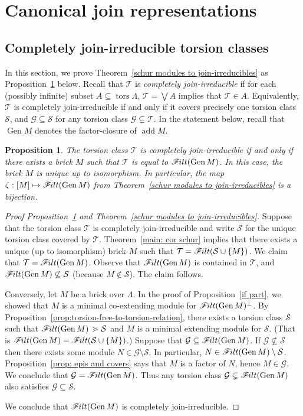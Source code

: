 \documentclass[10pt]{amsart}
\providecommand{\1}{}
\DeclareMathOperator{\tors}{tors}
\DeclareMathOperator{\add}{add}
\newcommand{\calG}{\mathcal{G}}
\newcommand{\calS}{\mathcal{S}}
\newcommand{\calT}{\mathcal{T}}
\newcommand{\filt}{\mathscr{F}\Mk ilt}
\newcommand{\covers}{{\,\,\,\cdot\!\!\!\! >\,\,}}
\renewcommand{\Join}{\bigvee}
\newcommand{\Gen}{\operatorname{Gen}}
\renewcommand{\1}{\hat{1}}
\newcommand{\0}{\hat{0}}
\newcommand{\newword}[1]{\emph{#1}}
\newcommand*{\Mk}{\mkern -2mu}
\newtheorem{proposition}[theorem]{Proposition}
\theoremstyle{definition}
\begin{document}
\section{Canonical join representations}
\subsection{Completely join-irreducible torsion classes}
In this section, we prove Theorem~\ref{schur modules to join-irreducibles} as Proposition~\ref{ji} below.
Recall that $\calT$ is \newword{completely join-irreducible} if for each (possibly infinite) subset $A\subseteq \tors \Lambda$, $\calT = \Join A $ implies that $\calT\in A$.
Equivalently, $\calT$ is completely join-irreducible if and only if it covers precisely one torsion class $\calS$, and $\calG\subseteq \calS$ for any torsion class $\calG\subsetneq \calT$.
In the statement below, recall that $\Gen M$ denotes the factor-closure of $\add M$.
\begin{proposition}\label{ji}
The torsion class $\calT$ is completely join-irreducible if and only
if there exists a brick $M$ such that $\calT$ is equal to $\filt(\Gen M)$.
In this case, the brick $M$ is unique up to isomorphism. 
In particular, the map $\zeta: [M]\mapsto \filt(\Gen M)$ from
Theorem~\ref{schur modules to join-irreducibles} is a bijection. 
\end{proposition}

\begin{proof}[Proof Proposition~\ref{ji} and Theorem~\ref{schur modules to join-irreducibles}]
Suppose that the torsion class $\calT$ is completely join-irreducible
and write $\calS$ for the unique torsion class covered by $\calT$.
Theorem~\ref{main: cor schur} implies that there exists a unique (up to isomorphism) brick $M$ such that ${\calT = \filt(\calS \cup \{M\})}$.
We claim that $\calT = \filt(\Gen M)$.
Observe that $\filt(\Gen M)$ is contained in $\calT$, and $\filt(\Gen M) \not\subseteq\calS$ (because $M\not\in \calS$).
The claim follows.

Conversely, let $M$ be a brick over $\Lambda$.
In the proof of Proposition~\ref{if part}, we showed that $M$ is a minimal co-extending module for $\filt(\Gen M)^\perp$.
By Proposition~\ref{prop:torsion-free-to-torsion-relation}, there exists a torsion class $\calS$ such that $\filt(\Gen M) \covers \calS$ and $M$ is a minimal extending module for $\calS$.
(That is $\filt(\Gen M) = \filt(\calS \cup \{M\})$.)
Suppose that $\calG\subseteq \filt(\Gen M)$.
If $\calG\not \subseteq \calS$ then there exists some module $N\in \calG\setminus \calS$.
In particular, $N\in\filt(\Gen M) \setminus \calS$.
Proposition~\ref{prop: epis and covers} says that $M$ is a factor of $N$, hence $M\in \calG$.
We conclude that $\calG= \filt(\Gen M)$.
Thus any torsion class $\calG\subsetneq\filt(\Gen M)$ also satisfies
$\calG\subseteq\calS$. 

We conclude that $\filt(\Gen M)$ is completely join-irreducible.
\end{proof}
\end{document}
